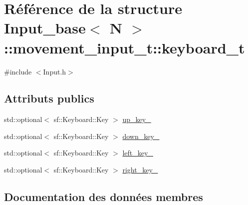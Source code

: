 \hypertarget{struct_input__base_1_1movement__input__t_1_1keyboard__t}{}\section{Référence de la structure Input\+\_\+base$<$ N $>$\+:\+:movement\+\_\+input\+\_\+t\+:\+:keyboard\+\_\+t}
\label{struct_input__base_1_1movement__input__t_1_1keyboard__t}


{\ttfamily \#include $<$Input.\+h$>$}

\subsection*{Attributs publics}
\begin{DoxyCompactItemize}
\item 
std\+::optional$<$ sf\+::\+Keyboard\+::\+Key $>$ \hyperlink{struct_input__base_1_1movement__input__t_1_1keyboard__t_aa8136cb8a1daced841a7bf3349ae0efd}{up\+\_\+key\+\_\+}
\item 
std\+::optional$<$ sf\+::\+Keyboard\+::\+Key $>$ \hyperlink{struct_input__base_1_1movement__input__t_1_1keyboard__t_ac8b60aa468df63d21381007cd45f5d02}{down\+\_\+key\+\_\+}
\item 
std\+::optional$<$ sf\+::\+Keyboard\+::\+Key $>$ \hyperlink{struct_input__base_1_1movement__input__t_1_1keyboard__t_ac7343c40948d66b359da4551c4b5e7c4}{left\+\_\+key\+\_\+}
\item 
std\+::optional$<$ sf\+::\+Keyboard\+::\+Key $>$ \hyperlink{struct_input__base_1_1movement__input__t_1_1keyboard__t_a7302a01598e9cec19fd3ad79c07f2d47}{right\+\_\+key\+\_\+}
\end{DoxyCompactItemize}


\subsection{Documentation des données membres}
\mbox{\label{struct_input__base_1_1movement__input__t_1_1keyboard__t_ac8b60aa468df63d21381007cd45f5d02}} 
